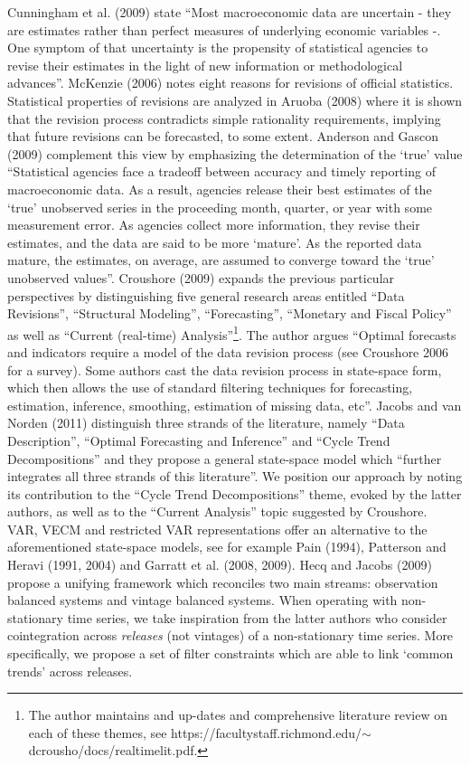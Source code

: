 \documentclass[11pt]{article}
\begin{document}
Cunningham et al. (2009) state ``Most macroeconomic data are uncertain - they are estimates rather than perfect measures of underlying economic variables -. One symptom of that uncertainty is the propensity of statistical agencies to revise their estimates in the light of new information or methodological advances''. McKenzie (2006) notes eight reasons for revisions of official statistics. Statistical properties of revisions are analyzed in Aruoba (2008) where it is shown that the revision process contradicts simple rationality requirements, implying that future revisions can be forecasted, to some extent. Anderson and Gascon (2009) complement this view by emphasizing the determination of the `true' value ``Statistical agencies face a tradeoff between accuracy and timely reporting of macroeconomic data. As a result, agencies release their best estimates of the `true' unobserved series in the proceeding month, quarter, or year with some measurement error. As agencies collect more information, they revise their estimates, and the data are said to be more `mature'. As the reported data mature, the estimates, on average, are assumed to converge toward the `true' unobserved values''. Croushore (2009) expands the previous particular perspectives by distinguishing five general research areas entitled ``Data Revisions'', ``Structural Modeling'', ``Forecasting'', ``Monetary and Fiscal Policy'' as well as ``Current (real-time) Analysis''\footnote{The author maintains and up-dates and comprehensive literature review on each of these themes, see https://facultystaff.richmond.edu/$\sim$dcrousho/docs/realtime\textunderscore lit.pdf.}. The author argues ``Optimal forecasts and indicators require a model of the data revision
process (see Croushore 2006 for a survey). Some authors cast the data
revision process in state-space form, which then allows the use of standard
filtering techniques for forecasting, estimation, inference, smoothing, estimation
of missing data, etc''. Jacobs and van Norden (2011) distinguish three strands of the literature, namely ``Data Description'', ``Optimal Forecasting and Inference'' and ``Cycle Trend Decompositions'' and they propose a general state-space model which ``further
integrates all three strands of this literature''. We position our approach by noting its contribution to the ``Cycle Trend Decompositions'' theme, evoked by the latter authors, as well as to the ``Current Analysis'' topic suggested by Croushore.\\

VAR, VECM and restricted VAR representations offer an alternative to the aforementioned state-space models, see for example Pain (1994), Patterson and Heravi (1991, 2004) and Garratt et al. (2008, 2009). Hecq and Jacobs (2009) propose a unifying framework which reconciles two main streams: observation balanced systems and vintage balanced systems. When operating with non-stationary time series, we take inspiration from the latter authors who consider cointegration across \emph{releases} (not vintages) of a non-stationary time series. More specifically, we propose a set of filter constraints which are able to link  `common trends' across releases.  \\
\end{document}
